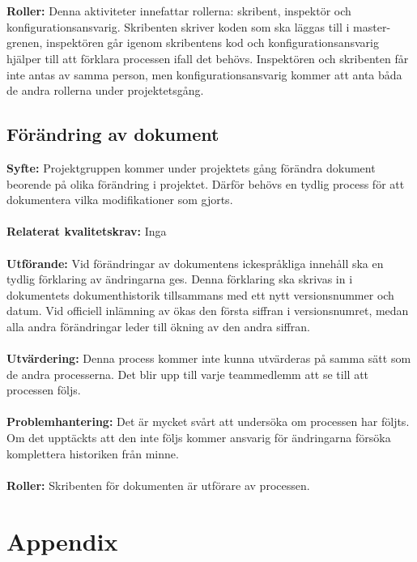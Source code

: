 \documentclass[10pt]{article}
\begin{document}
	\\\\
	\textbf{Roller:} Denna aktiviteter innefattar rollerna: skribent, inspektör och konfigurationsansvarig. Skribenten skriver koden som ska läggas till i master-grenen, inspektören går igenom skribentens kod och konfigurationsansvarig hjälper till att förklara processen ifall det behövs. Inspektören och skribenten får inte antas av samma person, men konfigurationsansvarig kommer att anta båda de andra rollerna under projektetsgång.

	\subsection{Förändring av dokument}
	\textbf{Syfte:} Projektgruppen kommer under projektets gång förändra dokument beorende på olika förändring i projektet. Därför behövs en tydlig process för att dokumentera vilka modifikationer som gjorts.
	\\\\
	\textbf{Relaterat kvalitetskrav:} Inga
	\\\\
	\textbf{Utförande:} Vid förändringar av dokumentens ickespråkliga innehåll ska en tydlig förklaring av ändringarna ges. Denna förklaring ska skrivas in i dokumentets dokumenthistorik tillsammans med ett nytt versionsnummer och datum. Vid officiell inlämning av ökas den första siffran i versionsnumret, medan alla andra förändringar leder till ökning av den andra siffran. 
	\\\\
	\textbf{Utvärdering:} Denna process kommer inte kunna utvärderas på samma sätt som de andra processerna. Det blir upp till varje teammedlemm att se till att processen följs. 
	\\\\
	\textbf{Problemhantering:} Det är mycket svårt att undersöka om processen har följts. Om det upptäckts att den inte följs kommer ansvarig för ändringarna försöka komplettera historiken från minne.
	\\\\
	\textbf{Roller:} Skribenten för dokumenten är utförare av processen.
	
	
\pagebreak
\section*{Appendix}
\end{document}
